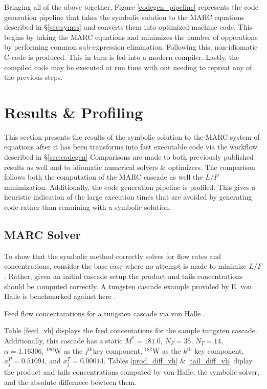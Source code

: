 \documentclass[preprint,12pt]{elsarticle}
\newcommand{\superscript}[1]{\ensuremath{^{\textrm{#1}}}}
\newcommand{\nuc}[2]{\superscript{#2}{#1}}
\newcommand{\jth}[0]{$j$\superscript{th}}
\newcommand{\kth}[0]{$k$\superscript{th}}
\begin{document}
Bringing all of the above together, Figure \ref{codegen_pipeline} represents the 
code generation pipeline that takes the symbolic solution to the MARC equations
described in \S\ref{sec:symes} and converts them into optimized machine code.
This begins by taking the MARC equations and minimizes the number of opperations
by performing common sub-expression elimination.  Following this, non-idiomatic
C-code is produced.  This in turn is fed into a modern compiler.  Lastly, the compiled
code may be executed at run time with out needing to repreat any of the previous steps.

\section{Results \& Profiling}
\label{sec:res}
This section presents the results of the symbolic solution to the MARC system 
of equations after it has been transforms into fast executable code via the 
workflow described in \S\ref{sec:codegen}  Comparisons are made to both previously
published results as well and to idiomatic numerical solvers \& optimizers.  The 
comparison follows both the computation of the MARC cascade as well the $L/F$ 
minimization. Additionally, the code generation pipeline is profiled.  This gives a
heuristic indication of the large execution times that are avoided by generating 
code rather than remaining with a symbolic solution.

\subsection{MARC Solver}
\label{sec:l-solver}

To show that the symbolic method correctly solves for flow rates and concentrations,
consider the base case where no attempt is made to minimize $L/F$.  Rather, given 
an initial cascade setup the product and tails concentrations should be computed 
correctly.  A tungsten cascade example provided by E. von Halle is benchmarked against
here \cite{VonHalle1987}.

\begin{table}[htbp]
\begin{center}
\caption{Feed flow concentarations for a tungsten cascade via von Halle 
\cite{VonHalle1987}.}

\end{center}
\label{feed_vh}
\end{table}

Table \ref{feed_vh} displays the feed concentations for the sample tungsten cascade.
Additionally, this cascade has a static $M^*=181.0$, $N_P=35$, $N_T=14$,
$\alpha=1.16306$, \nuc{W}{180} as the \jth key component, \nuc{W}{182} as the \kth
key component, $x_j^P=0.51094$, and $x_j^T=0.00014$.  Tables \ref{prod_diff_vh} \&
\ref{tail_diff_vh} diplay the product and tails concentrations computed by von Halle, 
the symbolic solver, and the absolute differnece bewteen them.
\end{document}
